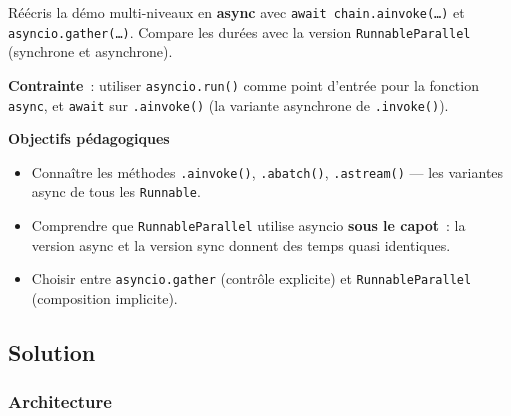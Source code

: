 \documentclass[11pt,a4paper]{article}
\begin{document}
\begin{tcolorbox}[title=Exercice bonus 5. La voie async pure et sa comparaison avec RunnableParallel]
Réécris la démo multi-niveaux en \textbf{async} avec \texttt{await
chain.ainvoke(\dots)} et \texttt{asyncio.gather(\dots)}. Compare les
durées avec la version \texttt{RunnableParallel} (synchrone et asynchrone).

\textbf{Contrainte}~: utiliser \texttt{asyncio.run()} comme point d'entrée
pour la fonction \texttt{async}, et \texttt{await} sur \texttt{.ainvoke()}
(la variante asynchrone de \texttt{.invoke()}).

\bigskip
\noindent\textbf{Objectifs pédagogiques}
\begin{itemize}[leftmargin=*]
  \item Connaître les méthodes \texttt{.ainvoke()}, \texttt{.abatch()},
        \texttt{.astream()} — les variantes async de tous les
        \texttt{Runnable}.
  \item Comprendre que \texttt{RunnableParallel} utilise asyncio
        \textbf{sous le capot}~: la version async et la version sync
        donnent des temps quasi identiques.
  \item Choisir entre \texttt{asyncio.gather} (contrôle explicite) et
        \texttt{RunnableParallel} (composition implicite).
\end{itemize}
\end{tcolorbox}

\subsection{Solution}

\subsubsection{Architecture}

\begin{center}
\end{center}
\end{document}
